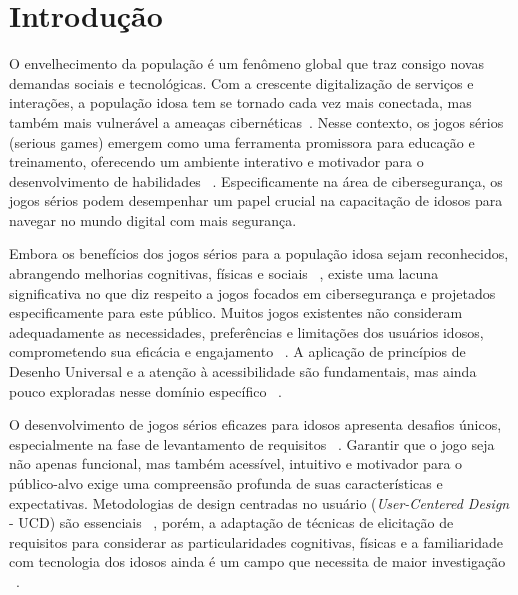 
\chapter[Introdução]{Introdução}
\label{cap:introducao}



 


O envelhecimento da população é um fenômeno global que traz consigo novas demandas sociais e tecnológicas. Com a crescente digitalização de serviços e interações, a população idosa tem se tornado cada vez mais conectada, mas também mais vulnerável a ameaças cibernéticas~\cite{morrison2021how}. Nesse contexto, os jogos sérios (serious games) emergem como uma ferramenta promissora para educação e treinamento, oferecendo um ambiente interativo e motivador para o desenvolvimento de habilidades ~\cite{connolly2012systematic}. Especificamente na área de cibersegurança, os jogos sérios podem desempenhar um papel crucial na capacitação de idosos para navegar no mundo digital com mais segurança.

Embora os benefícios dos jogos sérios para a população idosa sejam reconhecidos, abrangendo melhorias cognitivas, físicas e sociais ~\cite{konstantinidis2010integration, mccallum2012gamification}, existe uma lacuna significativa no que diz respeito a jogos focados em cibersegurança e projetados especificamente para este público. Muitos jogos existentes não consideram adequadamente as necessidades, preferências e limitações dos usuários idosos, comprometendo sua eficácia e engajamento ~\cite{mol2021desirable}. A aplicação de princípios de Desenho Universal e a atenção à acessibilidade são fundamentais, mas ainda pouco exploradas nesse domínio específico ~\cite{belarmino2021criterios}.

O desenvolvimento de jogos sérios eficazes para idosos apresenta desafios únicos, especialmente na fase de levantamento de requisitos ~\cite{beristain2021standardizing}. Garantir que o jogo seja não apenas funcional, mas também acessível, intuitivo e motivador para o público-alvo exige uma compreensão profunda de suas características e expectativas. Metodologias de design centradas no usuário (\textit{User-Centered Design} - UCD) são essenciais ~\cite{brox2017user}, porém, a adaptação de técnicas de elicitação de requisitos para considerar as particularidades cognitivas, físicas e a familiaridade com tecnologia dos idosos ainda é um campo que necessita de maior investigação ~\cite{fua2013designing}.

